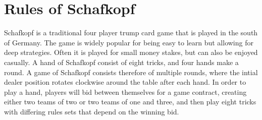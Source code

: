 \chapter{Rules of Schafkopf}
Schafkopf is a traditional four player trump card game that is played in the south of Germany.
The game is widely popular for being easy to learn but allowing for deep strategies.
Often it is played for small money stakes, but can also be enjoyed casually.
A hand of Schafkopf consist of eight tricks, and four hands make a round.
A game of Schafkopf consists therefore of multiple rounds, where the intial dealer position rotates
clockwise around the table after each hand.
In order to play a hand, players will bid between themselves for a game contract, creating either two teams of two or
two teams of one and three, and then play eight tricks with differing rules sets that depend on the winning bid.

